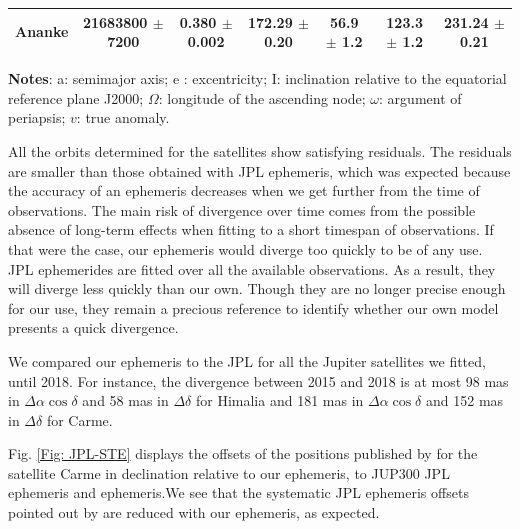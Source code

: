 \documentclass[useAMS,usenatbib]{mn2e}
\begin{document}
\begin{table}
\begin{center}
\begin{tabular}{ccccccc}
Ananke &  21683800  $\pm$ 7200  &     0.380 $\pm$ 0.002      &   172.29 $\pm$ 0.20      &   56.9 $\pm$ 1.2      &   123.3 $\pm$ 1.2      &   231.24 $\pm$ 0.21  \\
\hline
\end{tabular} 
\end{center}
\textbf{Notes}: a: semimajor axis; e : excentricity; I: inclination relative to the equatorial reference plane J2000; $\Omega$: longitude of the ascending node; $\omega$: argument of periapsis; $v$: true anomaly.
\end{table}

All the orbits determined for the satellites show satisfying residuals. The residuals are smaller than those obtained with JPL ephemeris, which was expected because the accuracy of an ephemeris decreases when we get further from the time of observations. The main risk of divergence over time comes from the possible absence of long-term effects when fitting to a short timespan of observations. If that were the case, our ephemeris would diverge too quickly to be of any use. JPL ephemerides are fitted over all the available observations. As a result, they will diverge less quickly than our own. Though they are no longer precise enough for our use, they remain a precious reference to identify whether our own model presents a quick divergence.

We compared our ephemeris to the JPL for all the Jupiter satellites we fitted, until 2018. For instance, the divergence between 2015 and 2018 is at most 98 mas in $\Delta \alpha \cos \delta$ and 58 mas in $\Delta \delta$ for Himalia and 181 mas in $\Delta \alpha \cos \delta$ and 152 mas in $\Delta \delta$ for Carme.

Fig. \ref{Fig: JPL-STE} displays the offsets of the positions published by \cite{GomesJunior2015} for the satellite Carme in declination relative to our ephemeris, to \cite{Jacobson2012} JUP300 JPL ephemeris and \cite{Emelyanov2008} ephemeris.We see that the systematic JPL ephemeris offsets pointed out by \cite{GomesJunior2015} are reduced with our ephemeris, as expected.
\end{document}
